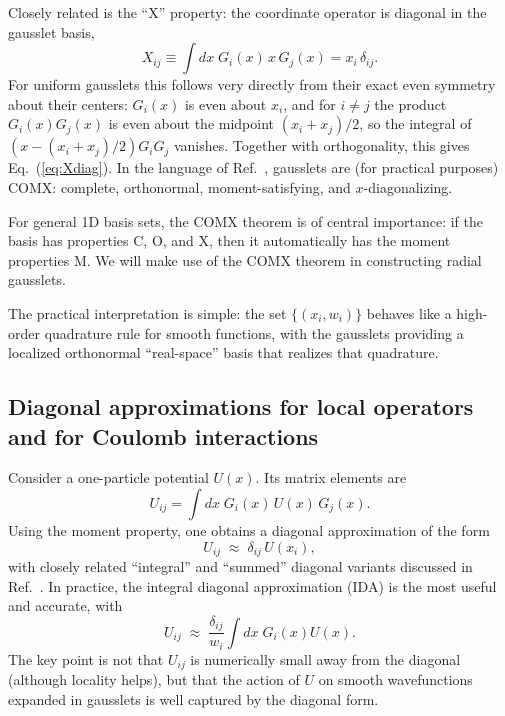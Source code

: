 \documentclass[aps,pra,reprint,longbibliography,nofootinbib]{revtex4-2}
\begin{document}
Closely related is the ``X'' property: the coordinate operator is diagonal in the gausslet basis,
\begin{equation}
  X_{ij} \equiv \int dx\; G_i(x)\,x\,G_j(x) = x_i\,\delta_{ij}.
  \label{eq:Xdiag}
\end{equation}
For uniform gausslets this follows very directly from their exact even symmetry about their centers:
$G_i(x)$ is even about $x_i$, and for $i\neq j$ the product $G_i(x)G_j(x)$ is even about the midpoint
$(x_i+x_j)/2$, so the integral of $(x-(x_i+x_j)/2)G_iG_j$ vanishes.  Together with orthogonality, this
gives Eq.~(\ref{eq:Xdiag}).  In the language of Ref.~\cite{White2023}, gausslets are (for practical
purposes) COMX: complete, orthonormal, moment-satisfying, and $x$-diagonalizing.

For general 1D basis sets, the COMX theorem\cite{White2023} is of central importance: if the basis has properties C, O, and X, then it automatically has the moment properties M.  We will make use of the COMX theorem in constructing radial gausslets. 

The practical interpretation is simple: the set $\{(x_i,w_i)\}$ behaves like a high-order quadrature
rule for smooth functions, with the gausslets providing a localized orthonormal ``real-space'' basis
that realizes that quadrature.

\subsection{Diagonal approximations for local operators and for Coulomb interactions}

Consider a one-particle potential $U(x)$.  Its matrix elements are
\begin{equation}
  U_{ij} = \int dx\; G_i(x)\,U(x)\,G_j(x).
  \label{eq:Uij_full}
\end{equation}
Using the moment property, one obtains a diagonal approximation of the form
\begin{equation}
  U_{ij} \;\approx\; \delta_{ij}\,U(x_i),
  \label{eq:Uij_point}
\end{equation}
with closely related ``integral'' and ``summed'' diagonal variants discussed in Ref.~\cite{White17}. In practice, the integral diagonal approximation (IDA) is the most useful and accurate, with 
\begin{equation}
U_{ij} \;\approx\; \frac{\delta_{ij}}{w_i}\int dx\; G_i(x) U(x) .
\label{eq:Uij_ida}
\end{equation}
The key point is not that $U_{ij}$ is numerically small away from the diagonal (although locality
helps), but that the action of $U$ on smooth wavefunctions expanded in gausslets is well captured by the diagonal form.
\end{document}
